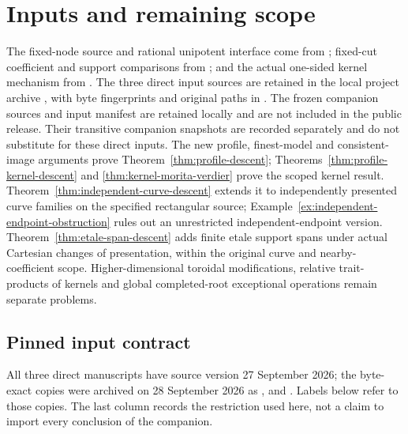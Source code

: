 \documentclass[11pt]{article}
\theoremstyle{definition}
\theoremstyle{remark}
\begin{document}
\section{Inputs and remaining scope}
\label{sec:inputs}
The fixed-node source and rational unipotent interface come from
\cite{Local}; fixed-cut coefficient and support comparisons from
\cite{Refinement}; and the actual one-sided kernel mechanism from
\cite{Kernels}.  The three direct input sources are retained in the local project archive
, with byte fingerprints and
original paths in . The frozen companion sources and input manifest are retained locally and are not included in the public release. Their
transitive companion snapshots are recorded separately and do
not substitute for these direct inputs.  The new profile, finest-model
and consistent-image arguments prove Theorem~\ref{thm:profile-descent};
Theorems~\ref{thm:profile-kernel-descent} and
\ref{thm:kernel-morita-verdier} prove the scoped kernel result.
Theorem~\ref{thm:independent-curve-descent} extends it to independently
presented curve families on the specified rectangular source;
Example~\ref{ex:independent-endpoint-obstruction} rules out an
unrestricted independent-endpoint version.
Theorem~\ref{thm:etale-span-descent} adds finite etale support spans
under actual Cartesian changes of presentation, within the original
curve and nearby-coefficient scope. Higher-dimensional
toroidal modifications, relative trait-products of kernels and global
completed-root exceptional operations remain separate problems.


\subsection*{Pinned input contract}
All three direct manuscripts have source version 27 September 2026;
the byte-exact copies were archived on 28 September 2026 as
,  and
. Labels below refer to those copies.
The last column records the restriction used here, not a claim to
import every conclusion of the companion.
\end{document}
